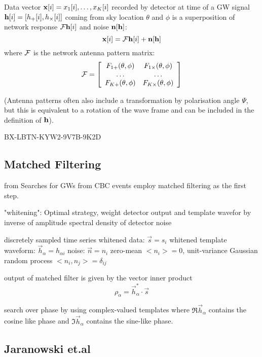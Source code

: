 Data vector ${\mathbf{x}} [i]={x_1[i], \ldots , x_K[i]}$ recorded by detector at time of a GW signal $\mathbf{h} [i] = [h_+[i], h_{\times}[i] ]$ coming from sky location $\theta$ and $\phi$ is a superposition of network response $\mathcal{F} \mathbf{h}[i]$ and noise $\mathbf{n}[\mathbf{h}]$:
\[ {\mathbf{x}} [i] = \mathcal{F} \mathbf{h}[i]+\mathbf{n}[\mathbf{h}] \]
where $\mathcal{F}$ is the network antenna pattern matrix:
\[ \mathcal{F} = \left[ \begin{array}{cc} 
				F_{1+}(\theta, \phi) & F_{1\times}(\theta, \phi) \\
				\ldots				& \ldots	\\
				F_{K+}(\theta, \phi) & F_{K \times}(\theta, \phi) \end{array} \right] \]

(Antenna patterns often also include a transformation by polarisation angle $\Psi$, but this is equivalent to a rotation of the wave frame and can be included in the definition of $\mathbf{h}$).

BX-LBTN-KYW2-9V7B-9K2D
\subsection{Matched Filtering}

from \cite{PhysRevD.82.044025}
Searches for GWs from CBC events employ matched filtering as the first step. 

"whitening": Optimal strategy, weight detector output and template wavefor by inverse of amplitude spectral density of detector noise 

discretely sampled time series
whitened data: $\overrightarrow{s}={s_i}$
whitened template waveform: $\overrightarrow{h}_\alpha = h_{\alpha i}$
noise: $\overrightarrow{n}={n_i}$ zero-mean $<n_i>=0$, unit-variance Gaussian random process $<n_i,n_j>=\delta_{ij}$


output of matched filter is given by the vector inner product 
\begin{equation}
\rho_\alpha = \overrightarrow{h}_\alpha^*\cdot \overrightarrow{s}
\end{equation}

search over phase by using complex-valued templates where $\mathfrak{R}\overrightarrow{h}_\alpha$ contains the cosine like phase and $\mathfrak{I}\overrightarrow{h}_\alpha$ contains the sine-like phase. 

\subsection{Jaranowski et.al}

